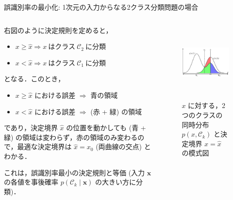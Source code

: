 \documentclass[uplatex,11pt,dvipdfmx,aspectratio=169,unicode,t]{beamer}
\numberwithin{equation}{section}
\newcommand{\CC}{\mathcal{C}}
\newcommand{\bs}[1]{\boldsymbol{#1}}
\newcommand{\1}{\bs{1}}
\newcommand{\0}{\bs{0}}
\begin{document}
\begin{frame}{誤識別率の最小化: 1次元の入力からなる2クラス分類問題の場合}
    \begin{columns}
        \begin{column}{0.55\textwidth}
            右図のように決定規則を定めると，
            \begin{itemize}
                \item $x \ge \widehat{x} \Longrightarrow x\ \text{はクラス}\ \CC_{2}\ \text{に分類}$
                \item $x < \widehat{x} \Longrightarrow x\ \text{はクラス}\ \CC_{1}\ \text{に分類}$
            \end{itemize}
            となる．このとき，
            \begin{itemize}
                \item $x \ge \widehat{x}$ における誤差 $\Longrightarrow$ 青の領域
                \item $x < \widehat{x}$ における誤差 $\Longrightarrow$ (赤 + 緑) の領域
            \end{itemize}
            であり，決定境界 $\widehat{x}$ の位置を動かしても (青 + 緑) の領域は変わらず，赤の領域のみ変わるので，最適な決定境界は $\widehat{x} = x_{0}$ (両曲線の交点) とわかる．
            
            これは，誤識別率最小の決定規則と等価 (入力 $\bs{x}$ の各値を事後確率 $p(\CC_{k} \mid \bs{x})$ の大きい方に分類)．
        \end{column}
        \begin{column}{0.45\textwidth}
            \begin{figure}
                \centering
                \includegraphics[height=4cm]{prml_fig_1-24.png}
                \caption{$x$ に対する，2つのクラスの同時分布 $p(x,\CC_{k})$ と決定境界 $x=\widehat{x}$ の模式図}
                \label{fig:1.24}
            \end{figure}
        \end{column}
    \end{columns}
\end{frame}
\end{document}
